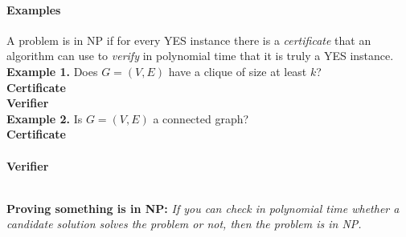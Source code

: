 \documentclass[11  pt]{article}
\begin{document}
	\paragraph{Examples}
	A problem is in NP if for every YES instance there is a \emph{certificate} that an algorithm can use to \emph{verify} in polynomial time that it is truly a YES instance. \\
	
	\textbf{Example 1.} Does $G = (V,E)$ have a clique of size at least $k$? \\
	
	\textbf{Certificate} \\%
	
	
	\textbf{Verifier} \\ %
	
	\vfill
	\textbf{Example 2.} Is $G = (V,E)$ a connected graph? \\
	
	\textbf{Certificate} \\ \\ %
	
	
	\textbf{Verifier} \\ \\ %
	
	\vfill
	
	\noindent \textbf{Proving something is in NP:}
	\emph{If you can check in polynomial time whether a candidate solution solves the problem or not, then the problem is in NP.}
	
	\newpage 
	
\end{document}
